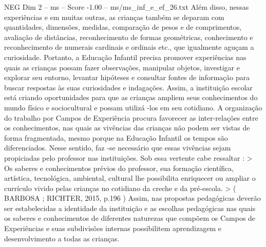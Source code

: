 \begin{textsample}{NEG Dim 2 – ms – Score -1.00 – ms/ms\_inf\_e\_ef\_26.txt}
Além disso, nessas experiências e em muitas outras, as crianças também se deparam com quantidades, dimensões, medidas, comparação de pesos e de comprimentos, avaliação de distâncias, reconhecimento de formas geométricas, conhecimento e reconhecimento de numerais cardinais e ordinais etc., que igualmente aguçam a curiosidade.
Portanto, a Educação Infantil precisa promover experiências nas quais as crianças possam fazer observações, manipular objetos, investigar e explorar seu entorno, levantar hipóteses e consultar fontes de informação para buscar respostas às suas curiosidades e indagações.
Assim, a instituição escolar está criando oportunidades para que as crianças ampliem seus conhecimentos do mundo físico e sociocultural e possam utilizá -los em seu cotidiano.
A organização do trabalho por Campos de Experiência procura favorecer as inter-relações entre os conhecimentos, nas quais as vivências das crianças não podem ser vistas de forma fragmentada, mesmo porque na Educação Infantil os tempos são diferenciados.
Nesse sentido, faz -se necessário que essas vivências sejam propiciadas pelo professor nas instituições.
Sob essa vertente cabe ressaltar : > Os saberes e conhecimentos prévios do professor, sua formação científica, artística, tecnológica, ambiental, cultural lhe possibilita enriquecer ou ampliar o currículo vivido pelas crianças no cotidiano da creche e da pré-escola. > ( BARBOSA ; RICHTER, 2015, p.196 ) Assim, nas propostas pedagógicas deverão ser estabelecidas a identidade da instituição e as escolhas pedagógicas nas quais os saberes e conhecimentos de diferentes naturezas que compõem os Campos de Experiências e suas subdivisões internas possibilitem aprendizagem e desenvolvimento a todas as crianças.

\end{textsample}

